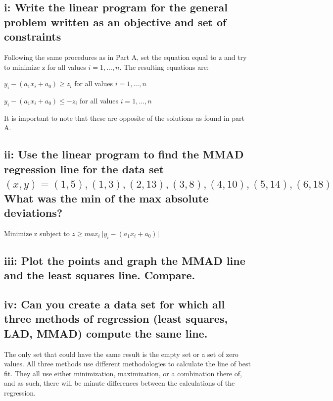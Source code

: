 \subsection{i: Write the linear program for the general problem written as an objective and set of constraints}
Following the same procedures as in Part A, set the equation equal to z and try to minimize z for all values $i = 1, ... , n$. The resulting equations are:
\begin{center} $ y_{i} - (a_{1}x_{i} + a_{0}) \geq z_{i}$  for all values $i = 1,...,n$\end{center}
\begin{center} $ y_{i} - (a_{1}x_{i} + a_{0}) \leq -z_{i}$  for all values $i = 1,...,n$\end{center}
It is important to note that these are opposite of the solutions as found in part A.

\subsection{ii: Use the linear program to find the MMAD regression line for the data set $(x,y) = { (1,5), (1, 3), (2, 13), ( 3, 8), (4,10), ( 5, 14), (6, 18) }$ What was the min of the max absolute deviations?}
Minimize z subject to $ z \geq max_{i}\ |{y_{i} - (a_{1}x_{i} + a_{0})|}$



\subsection{iii: Plot the points and graph the MMAD line and the least squares line. Compare.}


\subsection{iv: Can you create a data set for which all three methods of regression (least squares, LAD, MMAD)
compute the same line.}
The only set that could have the same result is the empty set or a set of zero values. All three methods use different methodologies to calculate the line of best fit. They all use either minimization, maximization, or a combination there of, and as such, there will be minute differences between the calculations of the regression. 


